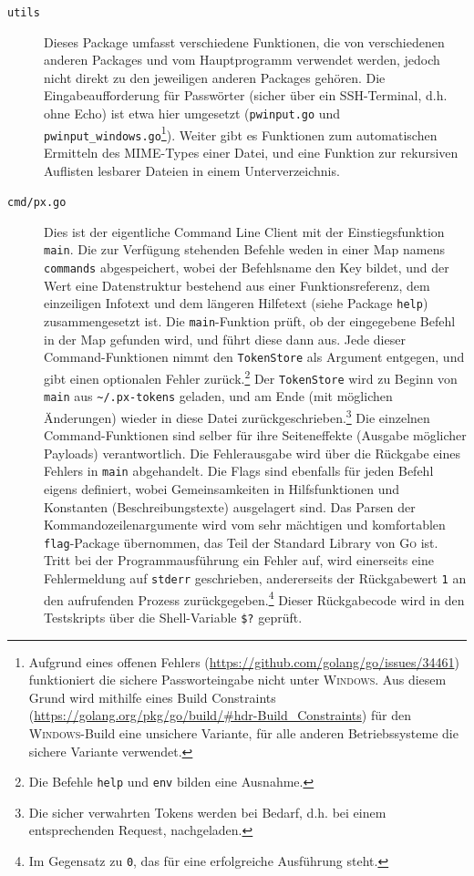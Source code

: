 \begin{description}
    \item[\texttt{utils}] Dieses Package umfasst verschiedene Funktionen, die von verschiedenen anderen Packages und vom Hauptprogramm verwendet werden, jedoch nicht direkt zu den jeweiligen anderen Packages gehören. Die Eingabeaufforderung für Passwörter (sicher über ein SSH-Terminal, d.h. ohne Echo) ist etwa hier umgesetzt (\texttt{pwinput.go} und \texttt{pwinput\_windows.go}\footnote{Aufgrund eines offenen Fehlers (\url{https://github.com/golang/go/issues/34461}) funktioniert die sichere Passworteingabe nicht unter \textsc{Windows}. Aus diesem Grund wird mithilfe eines Build Constraints (\url{https://golang.org/pkg/go/build/\#hdr-Build\_Constraints}) für den \textsc{Windows}-Build eine unsichere Variante, für alle anderen Betriebssysteme die sichere Variante verwendet.}). Weiter gibt es Funktionen zum automatischen Ermitteln des MIME-Types einer Datei, und eine Funktion zur rekursiven Auflisten lesbarer Dateien in einem Unterverzeichnis.
    \item[\texttt{cmd/px.go}] Dies ist der eigentliche Command Line Client mit der Einstiegsfunktion \texttt{main}. Die zur Verfügung stehenden Befehle weden in einer Map namens \texttt{commands} abgespeichert, wobei der Befehlsname den Key bildet, und der Wert eine Datenstruktur bestehend aus einer Funktionsreferenz, dem einzeiligen Infotext und dem längeren Hilfetext (siehe Package \texttt{help}) zusammengesetzt ist. Die \texttt{main}-Funktion prüft, ob der eingegebene Befehl in der Map gefunden wird, und führt diese dann aus. Jede dieser Command-Funktionen nimmt den \texttt{TokenStore} als Argument entgegen, und gibt einen optionalen Fehler zurück.\footnote{Die Befehle \texttt{help} und \texttt{env} bilden eine Ausnahme.} Der \texttt{TokenStore} wird zu Beginn von \texttt{main} aus \texttt{\~{}/.px-tokens} geladen, und am Ende (mit möglichen Änderungen) wieder in diese Datei zurückgeschrieben.\footnote{Die sicher verwahrten Tokens werden bei Bedarf, d.h. bei einem entsprechenden Request, nachgeladen.} Die einzelnen Command-Funktionen sind selber für ihre Seiteneffekte (Ausgabe möglicher Payloads) verantwortlich. Die Fehlerausgabe wird über die Rückgabe eines Fehlers in \texttt{main} abgehandelt. Die Flags sind ebenfalls für jeden Befehl eigens definiert, wobei Gemeinsamkeiten in Hilfsfunktionen und Konstanten (Beschreibungstexte) ausgelagert sind. Das Parsen der Kommandozeilenargumente wird vom sehr mächtigen und komfortablen \texttt{flag}-Package übernommen, das Teil der Standard Library von \textsc{Go} ist. Tritt bei der Programmausführung ein Fehler auf, wird einerseits eine Fehlermeldung auf \texttt{stderr} geschrieben, andererseits der Rückgabewert \texttt{1} an den aufrufenden Prozess zurückgegeben.\footnote{Im Gegensatz zu \texttt{0}, das für eine erfolgreiche Ausführung steht.} Dieser Rückgabecode wird in den Testskripts über die Shell-Variable \texttt{\$?} geprüft.
\end{description}

